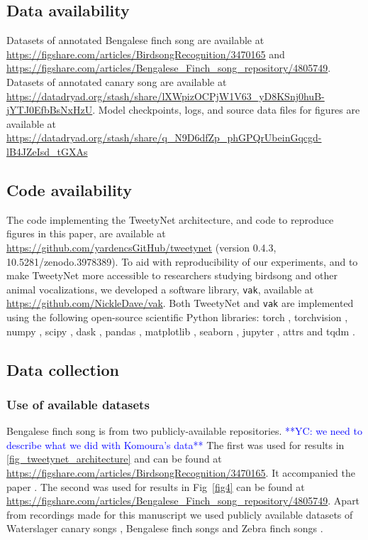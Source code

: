 \documentclass[10pt,letterpaper]{article}
\begin{document}
\subsection*{Data availability}
Datasets of annotated Bengalese finch song are available at 
\url{https://figshare.com/articles/BirdsongRecognition/3470165} and  \url{https://figshare.com/articles/Bengalese_Finch_song_repository/4805749}.
Datasets of annotated canary song are available at \url{ https://datadryad.org/stash/share/lXWpizOCPjW1V63_yD8KSnj0huB-jYTJ0EfbBsNxHzU}.
Model checkpoints, logs, and source data files for figures are available at \url{https://datadryad.org/stash/share/q_N9D6dfZp_phGPQrUbeinGqcgd-lB4JZeIsd_tGXAs}

\subsection*{Code availability}
\label{methods:code}
The code implementing the TweetyNet architecture,
and code to reproduce figures in this paper, are available at
\url{https://github.com/yardencsGitHub/tweetynet}
(version 0.4.3, 10.5281/zenodo.3978389).
To aid with reproducibility of our experiments,
and to make TweetyNet more accessible to researchers studying birdsong
and other animal vocalizations, we developed a software library, 
\texttt{vak}, available at \url{https://github.com/NickleDave/vak}.
Both TweetyNet and \texttt{vak} are implemented using 
the following open-source scientific Python libraries: 
torch \cite{paszke_automatic_2017}, 
torchvision \cite{marcel_torchvision_2010}, 
numpy \cite{walt_numpy_2011, harris2020array}, 
scipy \cite{virtanen_scipy_2020}, 
dask \cite{dask_development_team_dask_2016}, 
pandas \cite{team_pandas-devpandas_2020}, 
matplotlib \cite{Hunter:2007,thomas_a_caswell_2020_4030140}, 
seaborn \cite{michael_waskom_2020_4019146}, 
jupyter \cite{kluyver2016jupyter},
attrs \cite{attrs}
and tqdm \cite{casper_da_costa_luis_2020_4054194}.

\subsection*{Data collection}
\subsubsection*{Use of available datasets}
Bengalese finch song is from two publicly-available repositories. \textcolor{blue}{**YC: we need to describe what we did with Komoura's data**}
The first \cite{koumura_birdsongrecognition_2016} was used for results in \ref{fig_tweetynet_architecture} and can be found at 
\url{https://figshare.com/articles/BirdsongRecognition/3470165}. It accompanied the paper \cite{koumura_automatic_2016-1}.
The second \cite{nicholson_bengalese_2017} was used for results in Fig~\ref{fig4} can be found at \url{https://figshare.com/articles/Bengalese_Finch_song_repository/4805749}.
Apart from recordings made for this manuscript we used publicly available datasets of Waterslager canary songs \cite{markowitz_long-range_2013}, Bengalese finch songs \cite{koumura_automatic_2016-1} and Zebra finch songs \cite{otchy_acute_2015}.
\end{document}
